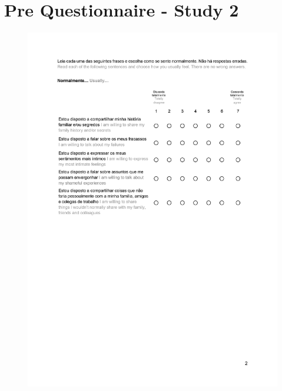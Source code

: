\section{Pre Questionnaire - Study 2}
\label{appendix:pre2}
\begin{figure}[h!]
\centering
\includegraphics[width=\textwidth]{figures/02_02.jpg}
\end{figure}

\clearpage
